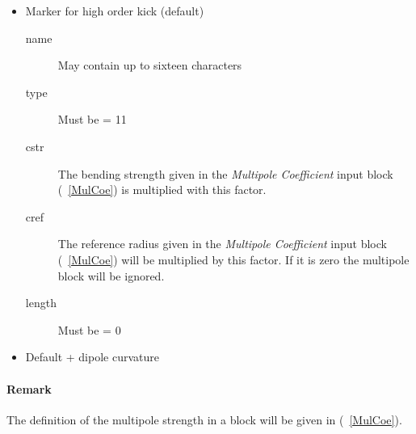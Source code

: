 \documentclass[a4paper,11pt]{report}
\begin{document}
\begin{itemize}
\item Marker for high order kick (default)
\begin{description}
\item [name] May contain up to sixteen characters
\item [type] Must be = 11
\item [cstr] The bending strength given in the {\em Multipole
    Coefficient} \/input block (~\ref{MulCoe}) is multiplied with this
  factor.
\item [cref] The reference radius given in the {\em Multipole
    Coefficient} \/input block (~\ref{MulCoe}) will be multiplied by
  this factor.  If it is zero the multipole block will be ignored.
\item [length] Must be = 0
\end{description}

\item Default + dipole curvature
\end{itemize}

\paragraph{Remark}
The definition of the multipole strength in a block will be given in
(~\ref{MulCoe}).
\end{document}
